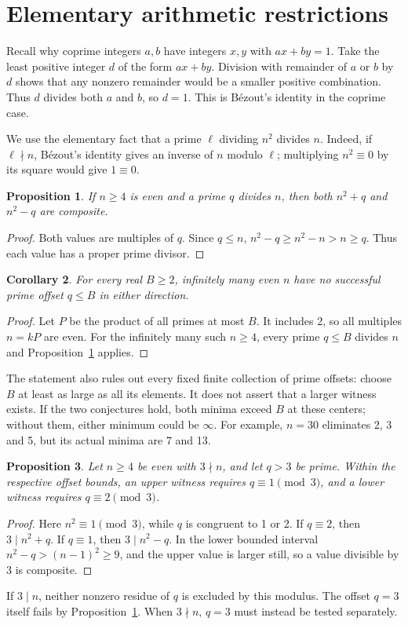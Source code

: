 \documentclass[11pt,a4paper]{article}
\newtheorem{proposition}{Proposition}
\newtheorem{corollary}[proposition]{Corollary}
\begin{document}
\newpage
\section{Elementary arithmetic restrictions}
Recall why coprime integers $a,b$ have integers $x,y$ with $ax+by=1$.
Take the least positive integer $d$ of the form $ax+by$. Division with
remainder of $a$ or $b$ by $d$ shows that any nonzero remainder would
be a smaller positive combination. Thus $d$ divides both $a$ and $b$,
so $d=1$. This is B\'ezout's identity in the coprime case.

We use the elementary fact that a prime $\ell$ dividing $n^2$ divides $n$.
Indeed, if $\ell\nmid n$, B\'ezout's identity gives an inverse of $n$ modulo
$\ell$; multiplying $n^2\equiv0$ by its square would give $1\equiv0$.

\begin{proposition}\label{prop:divisor}
If $n\ge4$ is even and a prime $q$ divides $n$, then both $n^2+q$ and
$n^2-q$ are composite.
\end{proposition}
\begin{proof}
Both values are multiples of $q$. Since $q\le n$,
$n^2-q\ge n^2-n>n\ge q$. Thus each value has a proper prime divisor.
\end{proof}

\begin{corollary}\label{prop:finite}
For every real $B\ge2$, infinitely many even $n$ have no successful prime
offset $q\le B$ in either direction.
\end{corollary}
\begin{proof}
Let $P$ be the product of all primes at most $B$. It includes 2, so all
multiples $n=kP$ are even. For the infinitely many such $n\ge4$, every
prime $q\le B$ divides $n$ and Proposition~\ref{prop:divisor} applies.
\end{proof}
The statement also rules out every fixed finite collection of prime offsets:
choose $B$ at least as large as all its elements. It does not assert that a
larger witness exists. If the two conjectures hold, both minima exceed $B$
at these centers; without them, either minimum could be $\infty$.
For example, $n=30$ eliminates 2, 3 and 5, but its actual minima are 7 and 13.

\begin{proposition}\label{prop:three}
Let $n\ge4$ be even with $3\nmid n$, and let $q>3$ be prime.
Within the respective offset bounds, an upper witness requires
$q\equiv1\pmod3$, and a lower witness requires $q\equiv2\pmod3$.
\end{proposition}
\begin{proof}
Here $n^2\equiv1\pmod3$, while $q$ is congruent to 1 or 2.
If $q\equiv2$, then $3\mid n^2+q$. If $q\equiv1$, then
$3\mid n^2-q$. In the lower bounded interval
$n^2-q>(n-1)^2\ge9$, and the upper value is larger still, so a value
divisible by 3 is composite.
\end{proof}
If $3\mid n$, neither nonzero residue of $q$ is excluded by this modulus.
The offset $q=3$ itself fails by Proposition~\ref{prop:divisor}.
When $3\nmid n$, $q=3$ must instead be tested separately.
\end{document}
